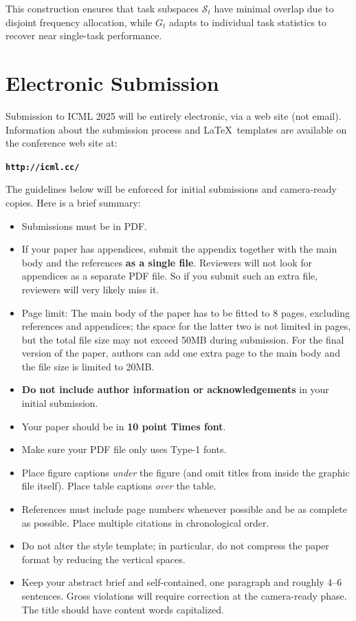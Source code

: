 \documentclass{article}
\theoremstyle{plain}
\theoremstyle{definition}
\theoremstyle{remark}
\begin{document}
This construction ensures that task subspaces $\mathcal{S}_t$ have minimal overlap due to disjoint frequency allocation, while $G_t$ adapts to individual task statistics to recover near single-task performance.


\section{Electronic Submission}
\label{submission}

Submission to ICML 2025 will be entirely electronic, via a web site
(not email). Information about the submission process and \LaTeX\ templates
are available on the conference web site at:
\begin{center}
\textbf{\texttt{http://icml.cc/}}
\end{center}

The guidelines below will be enforced for initial submissions and
camera-ready copies. Here is a brief summary:
\begin{itemize}
\item Submissions must be in PDF\@. 
\item If your paper has appendices, submit the appendix together with the main body and the references \textbf{as a single file}. Reviewers will not look for appendices as a separate PDF file. So if you submit such an extra file, reviewers will very likely miss it.
\item Page limit: The main body of the paper has to be fitted to 8 pages, excluding references and appendices; the space for the latter two is not limited in pages, but the total file size may not exceed 50MB during submission. For the final version of the paper, authors can add one extra page to the main body and the file size is limited to 20MB.
\item \textbf{Do not include author information or acknowledgements} in your
    initial submission.
\item Your paper should be in \textbf{10 point Times font}.
\item Make sure your PDF file only uses Type-1 fonts.
\item Place figure captions \emph{under} the figure (and omit titles from inside
    the graphic file itself). Place table captions \emph{over} the table.
\item References must include page numbers whenever possible and be as complete
    as possible. Place multiple citations in chronological order.
\item Do not alter the style template; in particular, do not compress the paper
    format by reducing the vertical spaces.
\item Keep your abstract brief and self-contained, one paragraph and roughly
    4--6 sentences. Gross violations will require correction at the
    camera-ready phase. The title should have content words capitalized.
\end{itemize}
\end{document}
